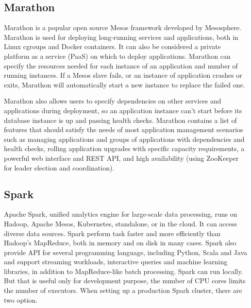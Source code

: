 \documentclass[12pt,oneside,openright,a4paper]{cpe-english-project}
\begin{document}
\newpage

\subsection{Marathon}
\hspace{10mm}Marathon is a popular open source Mesos framework developed by Mesosphere. Marathon is used for deploying long-running services and applications, both in Linux cgroups and Docker containers. It can also be considered a private platform as a service (PaaS) on which to deploy applications. Marathon can specify the resources needed for each instance of an application and number of running instances. If a Mesos slave fails, or an instance of application crashes or exits, Marathon will automatically start a new instance to replace the failed one.

\hspace{10mm}Marathon also allows users to specify dependencies on other services and applications during deployment, so an application instance can’t start before its database instance is up and passing health checks. Marathon contains a list of features that should satisfy the needs of most application management scenarios such as managing applications and groups of applications with dependencies and health checks, rolling application upgrades with specific capacity requirements, a powerful web interface and REST API, and high availability (using ZooKeeper for leader election and coordination).\cite{mesosInAction}

\newpage

\subsection{Spark}
\hspace{10mm}Apache Spark, unified analytics engine for large-scale data processing, runs on Hadoop, Apache Mesos, Kubernetes, standalone, or in the cloud. It can access diverse data sources. Spark perform task faster and more efficiently than Hadoop’s MapReduce, both in memory and on disk in many cases. Spark also provide API for several programming language, including Python, Scala and Java and support streaming workloads, interactive queries and machine learning libraries, in addition to MapReduce-like batch processing.  Spark can run locally. But that is useful only for development purpose, the number of CPU cores limits the number of executors. When setting up a production Spark cluster, there are two option.
\end{document}
